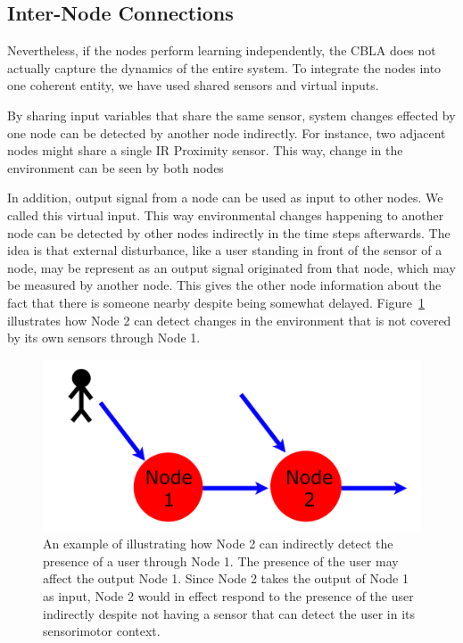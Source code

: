 \subsection{Inter-Node Connections}

Nevertheless, if the nodes perform learning independently, the CBLA does not actually capture the dynamics of the entire system. To integrate the nodes into one coherent entity, we have used shared sensors and virtual inputs.

By sharing input variables that share the same sensor, system changes effected by one node can be detected by another node indirectly. For instance, two adjacent nodes might share a single IR Proximity sensor. This way, change in the environment can be seen by both nodes

In addition, output signal from a node can be used as input to other nodes. We called this virtual input. This way environmental changes happening to another node can be detected by other nodes indirectly in the time steps afterwards. The idea is that external disturbance, like a user standing in front of the sensor of a node, may be represent as an output signal originated from that node, which may be measured by another node. This gives the other node information about the fact that there is someone nearby despite being somewhat delayed. Figure~\ref{fig:Indirect input diagram} illustrates how Node 2 can detect changes in the environment that is not covered by its own sensors through Node 1.


\begin{figure}[!htbp]
	\centering
	\includegraphics[height=0.20 \textheight]{"fig/cbla/Indirect input diagram"}
	\caption[Illustration explaining how virtual inputs may be used to detect changes outside of a node's sensorimotor context]{An example of illustrating how Node 2 can indirectly detect the presence of a user through Node 1. The presence of the user may affect the output Node 1. Since Node 2 takes the output of Node 1 as input, Node 2 would in effect respond to the presence of the user indirectly despite not having a sensor that can detect the user in its sensorimotor context.}
	\label{fig:Indirect input diagram}
\end{figure}

\FloatBarrier  


